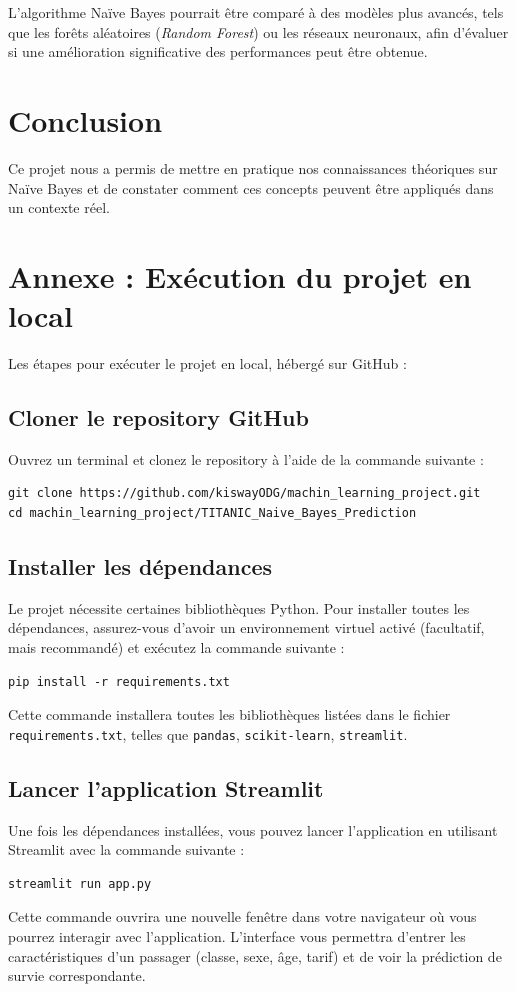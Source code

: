 \documentclass{rapportECL}
\begin{document}
L'algorithme Naïve Bayes pourrait être comparé à des modèles plus avancés, tels que les forêts aléatoires (\textit{Random Forest}) ou les réseaux neuronaux, afin d'évaluer si une amélioration significative des performances peut être obtenue.

\section{Conclusion}
Ce projet nous a permis de mettre en pratique nos connaissances théoriques sur Naïve Bayes et de constater comment ces concepts peuvent être appliqués dans un contexte réel.




\newpage

\section*{Annexe : Exécution du projet en local}

Les étapes pour exécuter le projet en local, hébergé sur GitHub :

\subsection*{Cloner le repository GitHub}
Ouvrez un terminal et clonez le repository à l'aide de la commande suivante :
\begin{verbatim}
git clone https://github.com/kiswayODG/machin_learning_project.git
cd machin_learning_project/TITANIC_Naive_Bayes_Prediction
\end{verbatim}

\subsection*{Installer les dépendances}
Le projet nécessite certaines bibliothèques Python. Pour installer toutes les dépendances, assurez-vous d'avoir un environnement virtuel activé (facultatif, mais recommandé) et exécutez la commande suivante :
\begin{verbatim}
pip install -r requirements.txt
\end{verbatim}
Cette commande installera toutes les bibliothèques listées dans le fichier \texttt{requirements.txt}, telles que \texttt{pandas}, \texttt{scikit-learn}, \texttt{streamlit}.

\subsection*{Lancer l'application Streamlit}
Une fois les dépendances installées, vous pouvez lancer l'application en utilisant Streamlit avec la commande suivante :
\begin{verbatim}
streamlit run app.py
\end{verbatim}
Cette commande ouvrira une nouvelle fenêtre dans votre navigateur où vous pourrez interagir avec l'application. L'interface vous permettra d'entrer les caractéristiques d'un passager (classe, sexe, âge, tarif) et de voir la prédiction de survie correspondante.
\end{document}
